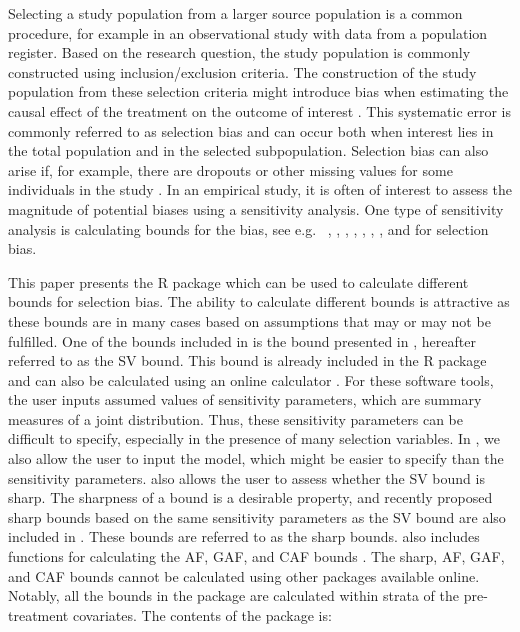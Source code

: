 Selecting a study population from a larger source population is a common
procedure, for example in an observational study with data from a population
register. Based on the research question, the study population is commonly
constructed using inclusion/exclusion criteria. The construction of the study
population from these selection criteria might introduce bias when estimating
the causal effect of the treatment on the outcome of interest
\citep{hernan2004structural}. This systematic error is commonly referred to as
selection bias and can occur both when interest lies in the total population
and in the selected subpopulation. Selection bias can also arise if,
for example, there are dropouts or other missing values for some individuals
in the study \citep{lu2022toward}. In an empirical study, it is often of interest to
assess the magnitude of potential biases using a sensitivity analysis. One type
of sensitivity analysis is calculating bounds for the bias, see e.g.~
\citet{huang2015bounding}, \citet{greenland2003quantifying}, \citet{flanders2019limits},
\citet{smith2019bounding}, \citet{zetterstrom2022selection}, \citet{zetterstrom2024},
\citet{zetterstrom2025investigations}, and \citet{duarte2024automated} for selection bias.

This paper presents the R package  which can be used to
calculate different bounds for selection bias. The ability to calculate
different bounds is attractive as these bounds are in many cases based on
assumptions that may or may not be fulfilled. One of the bounds included in
 is the bound presented in \citet{smith2019bounding}, hereafter
referred to as the SV bound. This bound is already included in the R package
 and can also be calculated using an online calculator
\citep{smith2019bounding, smith2021multiple}. For these software tools, the user inputs
assumed values of sensitivity parameters, which are summary measures of a joint
distribution. Thus, these sensitivity parameters can be difficult to specify,
especially in the presence of many selection variables. In ,
we also allow the user to input the model, which might be easier to specify than
the sensitivity parameters.  also allows the
user to assess whether the SV bound is sharp. The sharpness of a bound is a
desirable property, and recently proposed sharp bounds based on the same
sensitivity parameters as the SV bound \citep{zetterstrom2025investigations} are also
included in . These bounds are referred to as the sharp
bounds.  also includes functions for
calculating the AF, GAF, and CAF bounds \citep{zetterstrom2022selection, zetterstrom2024}.
The sharp, AF, GAF, and CAF bounds cannot be calculated using other packages
available online. Notably, all the bounds in the
 package are calculated within strata of the
pre-treatment covariates. The contents of the  package is:

